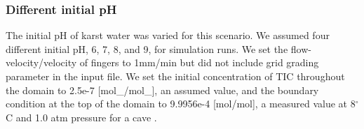 \subsubsection*{Different initial pH} \label{ssec:diffpH}

The initial pH of karst water was varied for this scenario. We assumed four different initial pH, 6, 7, 8, and 9, 
for simulation runs. We set the flow-velocity/velocity of  fingers to 1mm/min but did not include grid grading 
parameter in the input file. We set the initial concentration of TIC throughout the domain to 2.5e-7 [mol\_/mol\_], 
an assumed value, and the boundary condition at the top of the domain to 9.9956e-4 [mol/mol], a measured value at 8$^{\circ}$C 
and 1.0 atm pressure for a cave \cite{Class2020}. \\


